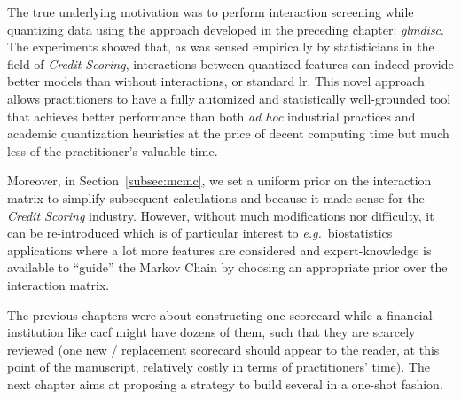 The true underlying motivation was to perform interaction screening while quantizing data using the approach developed in the preceding chapter: \textit{glmdisc}.
The experiments showed that, as was sensed empirically by statisticians in the field of \textit{Credit Scoring}, interactions between quantized features can indeed provide better models than without interactions, or standard \gls{lr}. This novel approach allows practitioners to have a fully automized and statistically well-grounded tool that achieves better performance than both \textit{ad hoc} industrial practices and academic quantization heuristics at the price of decent computing time but much less of the practitioner's valuable time.

Moreover, in Section~\ref{subsec:mcmc}, we set a uniform prior on the interaction matrix to simplify subsequent calculations and because it made sense for the \textit{Credit Scoring} industry. However, without much modifications nor difficulty, it can be re-introduced which is of particular interest to \textit{e.g.}\ biostatistics applications where a lot more features are considered and expert-knowledge is available to ``guide'' the Markov Chain by choosing an appropriate prior over the interaction matrix.

\bigskip

The previous chapters were about constructing one scorecard while a financial institution like \gls{cacf} might have dozens of them, such that they are scarcely reviewed (one new / replacement scorecard should appear to the reader, at this point of the manuscript, relatively costly in terms of practitioners' time). The next chapter aims at proposing a strategy to build several in a one-shot fashion.



\printbibliography[heading=subbibliography, title=References of Chapter 4]
